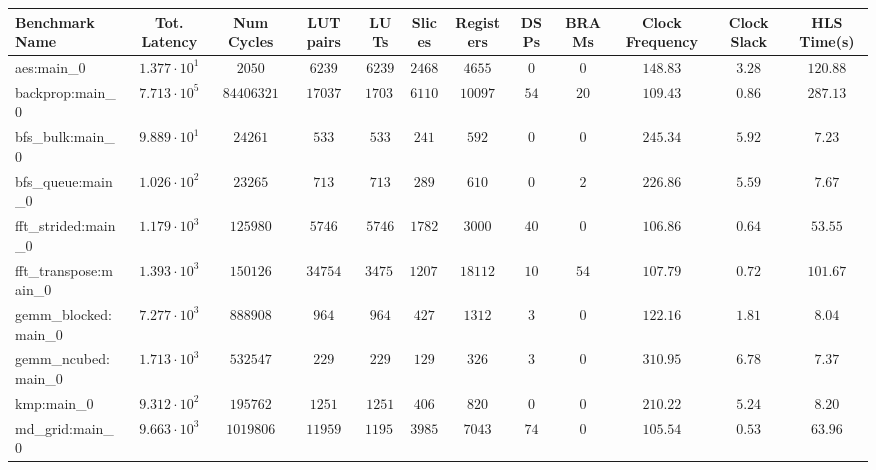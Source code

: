 \begin{tabular}{|l|c|c|c|c|c|c|c|c|c|c|c|}
\hline
Benchmark Name         & Tot. Latency           & Num Cycles   & LUT pairs  & LUTs       & Slices    & Registers & DSPs    & BRAMs  & Clock Frequency & Clock Slack & HLS Time(s) \\
\hline
aes:main\_0            & $ 1.377 \cdot 10^{1} $ & $ 2050     $ & $ 6239   $ & $ 6239   $ & $ 2468  $ & $ 4655  $ & $ 0   $ & $ 0  $ & $ 148.83      $ & $ 3.28    $ & $ 120.88  $ \\
backprop:main\_0       & $ 7.713 \cdot 10^{5} $ & $ 84406321 $ & $ 17037  $ & $ 17037  $ & $ 6110  $ & $ 10097 $ & $ 54  $ & $ 20 $ & $ 109.43      $ & $ 0.86    $ & $ 287.13  $ \\
bfs\_bulk:main\_0      & $ 9.889 \cdot 10^{1} $ & $ 24261    $ & $ 533    $ & $ 533    $ & $ 241   $ & $ 592   $ & $ 0   $ & $ 0  $ & $ 245.34      $ & $ 5.92    $ & $ 7.23    $ \\
bfs\_queue:main\_0     & $ 1.026 \cdot 10^{2} $ & $ 23265    $ & $ 713    $ & $ 713    $ & $ 289   $ & $ 610   $ & $ 0   $ & $ 2  $ & $ 226.86      $ & $ 5.59    $ & $ 7.67    $ \\
fft\_strided:main\_0   & $ 1.179 \cdot 10^{3} $ & $ 125980   $ & $ 5746   $ & $ 5746   $ & $ 1782  $ & $ 3000  $ & $ 40  $ & $ 0  $ & $ 106.86      $ & $ 0.64    $ & $ 53.55   $ \\
fft\_transpose:main\_0 & $ 1.393 \cdot 10^{3} $ & $ 150126   $ & $ 34754  $ & $ 34754  $ & $ 12079 $ & $ 18112 $ & $ 10  $ & $ 54 $ & $ 107.79      $ & $ 0.72    $ & $ 101.67  $ \\
gemm\_blocked:main\_0  & $ 7.277 \cdot 10^{3} $ & $ 888908   $ & $ 964    $ & $ 964    $ & $ 427   $ & $ 1312  $ & $ 3   $ & $ 0  $ & $ 122.16      $ & $ 1.81    $ & $ 8.04    $ \\
gemm\_ncubed:main\_0   & $ 1.713 \cdot 10^{3} $ & $ 532547   $ & $ 229    $ & $ 229    $ & $ 129   $ & $ 326   $ & $ 3   $ & $ 0  $ & $ 310.95      $ & $ 6.78    $ & $ 7.37    $ \\
kmp:main\_0            & $ 9.312 \cdot 10^{2} $ & $ 195762   $ & $ 1251   $ & $ 1251   $ & $ 406   $ & $ 820   $ & $ 0   $ & $ 0  $ & $ 210.22      $ & $ 5.24    $ & $ 8.20    $ \\
md\_grid:main\_0       & $ 9.663 \cdot 10^{3} $ & $ 1019806  $ & $ 11959  $ & $ 11959  $ & $ 3985  $ & $ 7043  $ & $ 74  $ & $ 0  $ & $ 105.54      $ & $ 0.53    $ & $ 63.96   $ \\

\end{tabular}
